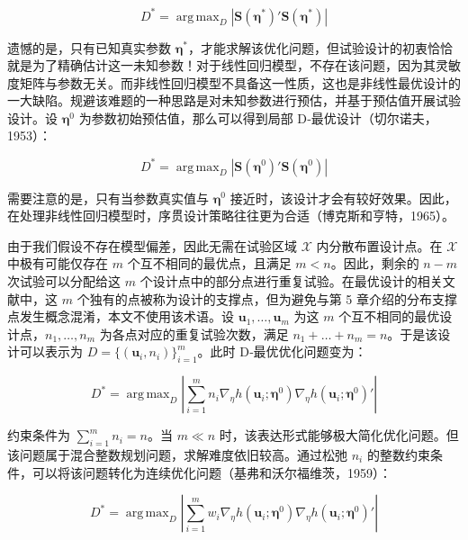 \documentclass{ctexart}
\DeclareMathOperator*{\argmax}{arg\,max}
\begin{document}
\begin{equation*}
D^*=\argmax_{D}|\boldsymbol{S}(\boldsymbol{\eta}^*)'\boldsymbol{S}(\boldsymbol{\eta}^*)|
\end{equation*}

遗憾的是，只有已知真实参数 $\boldsymbol{\eta}^*$，才能求解该优化问题，但试验设计的初衷恰恰就是为了精确估计这一未知参数！对于线性回归模型，不存在该问题，因为其灵敏度矩阵与参数无关。而非线性回归模型不具备这一性质，这也是非线性最优设计的一大缺陷。规避该难题的一种思路是对未知参数进行预估，并基于预估值开展试验设计。设 $\boldsymbol{\eta}^0$ 为参数初始预估值，那么可以得到局部 D‑最优设计（切尔诺夫，1953）：

\begin{equation*}
D^*=\argmax_{D}|\boldsymbol{S}(\boldsymbol{\eta}^0)'\boldsymbol{S}(\boldsymbol{\eta}^0)|
\end{equation*}

需要注意的是，只有当参数真实值与 $\boldsymbol{\eta}^0$ 接近时，该设计才会有较好效果。因此，在处理非线性回归模型时，序贯设计策略往往更为合适（博克斯和亨特，1965）。

由于我们假设不存在模型偏差，因此无需在试验区域 $\mathcal{X}$ 内分散布置设计点。在 $\mathcal{X}$ 中极有可能仅存在 $m$ 个互不相同的最优点，且满足 $m<n$。因此，剩余的 $n-m$ 次试验可以分配给这 $m$ 个设计点中的部分点进行重复试验。在最优设计的相关文献中，这 $m$ 个独有的点被称为设计的支撑点，但为避免与第 5 章介绍的分布支撑点发生概念混淆，本文不使用该术语。设 $\boldsymbol{u}_1,\dots,\boldsymbol{u}_m$ 为这 $m$ 个互不相同的最优设计点，$n_1,\dots,n_m$ 为各点对应的重复试验次数，满足 $n_1+\dots+n_m=n$。于是该设计可以表示为 $D=\{(\boldsymbol{u}_i,n_i)\}_{i=1}^{m}$。此时 D‑最优优化问题变为：

\begin{equation*}
D^{*}=\argmax_{D}\left|\sum_{i=1}^{m}n_i\nabla_{\eta}h(\boldsymbol{u}_i;\boldsymbol{\eta}^0)\nabla_{\eta}h(\boldsymbol{u}_i;\boldsymbol{\eta}^0)'\right|
\tag{9.10}
\end{equation*}

约束条件为 $\sum_{i=1}^{m}n_i=n$。当 $m\ll n$ 时，该表达形式能够极大简化优化问题。但该问题属于混合整数规划问题，求解难度依旧较高。通过松弛 $n_i$ 的整数约束条件，可以将该问题转化为连续优化问题（基弗和沃尔福维茨，1959）：

\begin{equation*}
D^{*}=\argmax_{D}\left|\sum_{i=1}^{m}w_i\nabla_{\eta}h(\boldsymbol{u}_i;\boldsymbol{\eta}^0)\nabla_{\eta}h(\boldsymbol{u}_i;\boldsymbol{\eta}^0)'\right|
\tag{9.11}
\end{equation*}
\end{document}
